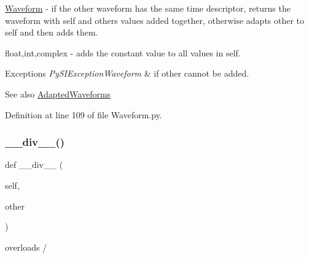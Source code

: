 \begin{DoxyItemize}
\item \hyperlink{classSignalIntegrity_1_1TimeDomain_1_1Waveform_1_1Waveform_1_1Waveform}{Waveform} -\/ if the other waveform has the same time descriptor, returns the waveform with self and others values added together, otherwise adapts other to self and then adds them.
\item float,int,complex -\/ adds the constant value to all values in self. 
\begin{DoxyExceptions}{Exceptions}
{\em Py\+S\+I\+Exception\+Waveform} & if other cannot be added. \\
\hline
\end{DoxyExceptions}
\begin{DoxySeeAlso}{See also}
\hyperlink{namespaceSignalIntegrity_1_1TimeDomain_1_1Waveform_1_1AdaptedWaveforms}{Adapted\+Waveforms} 
\end{DoxySeeAlso}

\end{DoxyItemize}

Definition at line 109 of file Waveform.\+py.

\mbox{\label{classSignalIntegrity_1_1TimeDomain_1_1Waveform_1_1Waveform_1_1Waveform_afeae6ad6a777e389fe51032a0fd81882}} 
\subsubsection{\texorpdfstring{\+\_\+\+\_\+div\+\_\+\+\_\+()}{\_\_div\_\_()}}
{\footnotesize\ttfamily def \+\_\+\+\_\+div\+\_\+\+\_\+ (\begin{DoxyParamCaption}\item[{}]{self,  }\item[{}]{other }\end{DoxyParamCaption})}



overloads / 


